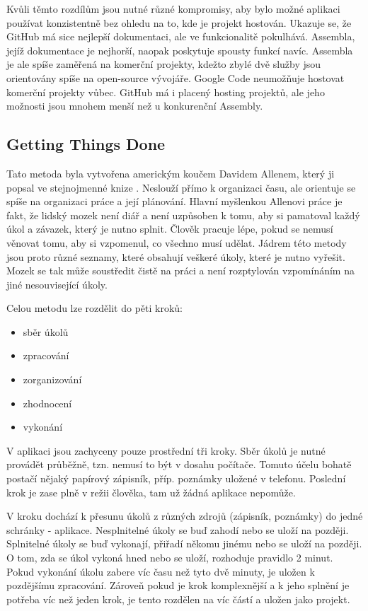Kvůli těmto rozdílům jsou nutné různé kompromisy, aby bylo možné aplikaci používat konzistentně bez ohledu na to, kde je projekt hostován. Ukazuje se, že GitHub má sice nejlepší dokumentaci, ale ve funkcionalitě pokulhává. Assembla, jejíž dokumentace je nejhorší, naopak poskytuje spousty funkcí navíc. Assembla je ale spíše zaměřená na komerční projekty, kdežto zbylé dvě služby jsou orientovány spíše na open-source vývojáře. Google Code neumožňuje hostovat komerční projekty vůbec. GitHub má i placený hosting projektů, ale jeho možnosti jsou mnohem menší než u konkurenční Assembly.

\subsection{Getting Things Done}

Tato metoda byla vytvořena americkým koučem Davidem Allenem, který ji popsal ve stejnojmenné knize \cite{gtd:book}. Neslouží přímo k organizaci času, ale orientuje se spíše na organizaci práce a její plánování. Hlavní myšlenkou Allenovi práce je fakt, že lidský mozek není diář a není uzpůsoben k tomu, aby si pamatoval každý úkol a závazek, který je nutno splnit. Člověk pracuje lépe, pokud se nemusí věnovat tomu, aby si vzpomenul, co všechno musí udělat. Jádrem této metody jsou proto různé seznamy, které obsahují veškeré úkoly, které je nutno vyřešit. Mozek se tak může soustředit čistě na práci a není rozptylován vzpomínáním na jiné nesouvisející úkoly.

Celou metodu lze rozdělit do pěti kroků\cite{gtd:wiki}:

\begin{itemize}
\item sběr úkolů
\item zpracování
\item zorganizování
\item zhodnocení
\item vykonání
\end{itemize}

V aplikaci jsou zachyceny pouze prostřední tři kroky. Sběr úkolů je nutné provádět průběžně, tzn. nemusí to být v dosahu počítače. Tomuto účelu bohatě postačí nějaký papírový zápisník, příp. poznámky uložené v telefonu. Poslední krok  je zase plně v režii člověka, tam už žádná aplikace nepomůže.

V kroku  dochází k přesunu úkolů z různých zdrojů (zápisník, poznámky) do jedné schránky - aplikace. Nesplnitelné úkoly se buď zahodí nebo se uloží na později. Splnitelné úkoly se buď vykonají, přiřadí někomu jinému nebo se uloží na později. O tom, zda se úkol vykoná hned nebo se uloží, rozhoduje pravidlo 2 minut. Pokud vykonání úkolu zabere víc času než tyto dvě minuty, je uložen k pozdějšímu zpracování. Zároveň pokud je krok komplexnější a k jeho splnění je potřeba víc než jeden krok, je tento rozdělen na víc částí a uložen jako projekt.

